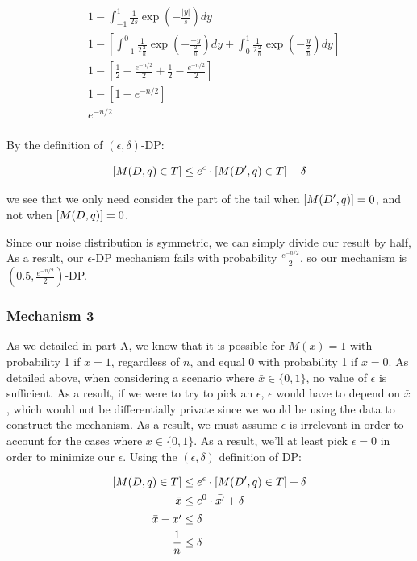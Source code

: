 \documentclass[12pt]{article}
\let\Pr\relax
\DeclareMathOperator*{\Pr}{\mathbb{P}}
\begin{document}
\begin{align*}
&1 - \int_{-1}^1 \frac{1}{2s} \exp(-\frac{|y|}{s}) dy \\
&1 - [\int_{-1}^0 \frac{1}{2\frac{2}{n}} \exp(-\frac{-y}{\frac{2}{n}}) dy + \int_0^1 \frac{1}{2\frac{2}{n}} \exp(-\frac{y}{\frac{2}{n}}) dy] \\
&1 - [\frac{1}{2} - \frac{e^{-n/2}}{2} + \frac{1}{2} - \frac{e^{-n/2}}{2}] \\
&1 - [1 - e^{-n/2}] \\
&e^{-n/2} \\
\end{align*}

By the definition of $(\epsilon, \delta)$-DP:

$$\Pr[M(D, q) \in T] \leq e^\epsilon \cdot \Pr[M(D', q) \in T] + \delta$$

we see that we only need consider the part of the tail when $\Pr[M(D', q)] = 0$, and not when $\Pr[M(D, q)] = 0$. 

\medskip

Since our noise distribution is symmetric, we can simply divide our result by half, As a result, our $\epsilon$-DP mechanism fails with probability $\frac{e^{-n/2}}{2}$, so our mechanism is $(0.5, \frac{e^{-n/2}}{2})$-DP.


\subsubsection*{Mechanism 3}

\noindent

As we detailed in part A, we know that it is possible for $M(x) = 1$ with probability 1 if $\bar{x} = 1$, regardless of $n$, and equal 0 with probability 1 if $\bar{x} = 0$. As detailed above, when considering a scenario where $\bar{x} \in \{0, 1\}$, no value of $\epsilon$ is sufficient. As a result, if we were to try to pick an $\epsilon$, $\epsilon$ would have to depend on $\bar{x}$, which would not be differentially private since we would be using the data to construct the mechanism. As a result, we must assume $\epsilon$ is irrelevant in order to account for the cases where $\bar{x} \in \{0, 1\}$. As a result, we'll at least pick $\epsilon = 0$ in order to minimize our $\epsilon$. Using the $(\epsilon, \delta)$ definition of DP:

\begin{align*}
\Pr[M(D, q) \in T] &\leq e^\epsilon \cdot \Pr[M(D', q) \in T] + \delta \\
\bar{x} &\leq e^0 \cdot \bar{x'} + \delta \\
\bar{x} - \bar{x'} &\leq \delta \\
\frac{1}{n} &\leq \delta \\
\end{align*}
\end{document}
